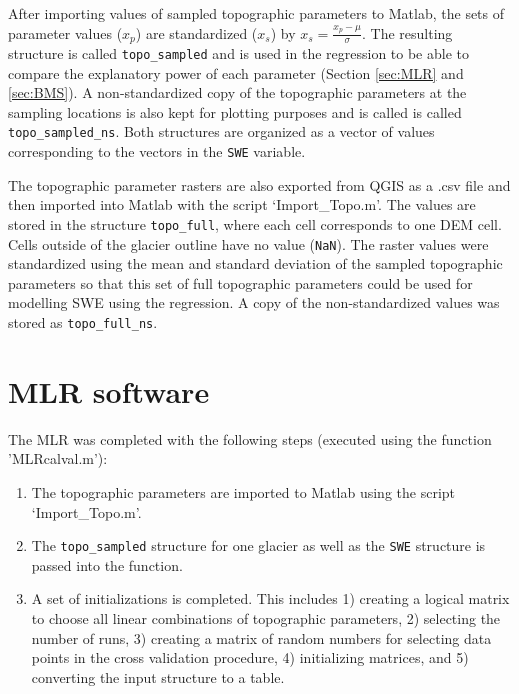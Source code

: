 \documentclass{sfuthesis}
\begin{document}
\begin{appendices}
 After importing values of sampled topographic parameters to Matlab, the sets of parameter values ($x_p$) are standardized ($x_s$) by $x_s = \frac{x_p-\mu}{\sigma}$. The resulting structure is called \texttt{topo\_sampled} and is used in the regression to be able to compare the explanatory power of each parameter (Section \ref{sec:MLR} and \ref{sec:BMS}). A non-standardized copy of the topographic parameters at the sampling locations is also kept for plotting purposes and is called is called \texttt{topo\_sampled\_ns}. Both structures are organized as a vector of values corresponding to the vectors in the \texttt{SWE} variable. 

The topographic parameter rasters are also exported from QGIS as a .csv file and then imported into Matlab with the script `Import\_Topo.m'. The values are stored in the structure \texttt{topo\_full}, where each cell corresponds to one DEM cell. Cells outside of the glacier outline have no value (\texttt{NaN}). The raster values were standardized using the mean and standard deviation of the sampled topographic parameters so that this set of full topographic parameters could be used for modelling SWE using the regression. A copy of the non-standardized values was stored as \texttt{topo\_full\_ns}.


	\chapter{MLR software}
\label{sec:MLRMethods}

The MLR was completed with the following steps (executed using the function 'MLRcalval.m'):
\begin{enumerate}
\item The topographic parameters are imported to Matlab using the script `Import\_Topo.m'.

\item The \texttt{topo\_sampled} structure for one glacier as well as the \texttt{SWE} structure is passed into the function.

\item A set of initializations is completed. This includes 1) creating a logical matrix to choose all linear combinations of topographic parameters, 2) selecting the number of runs, 3) creating a matrix of random numbers for selecting data points in the cross validation procedure, 4) initializing matrices, and 5) converting the input structure to a table.


\end{enumerate}
\end{appendices}
\end{document}
